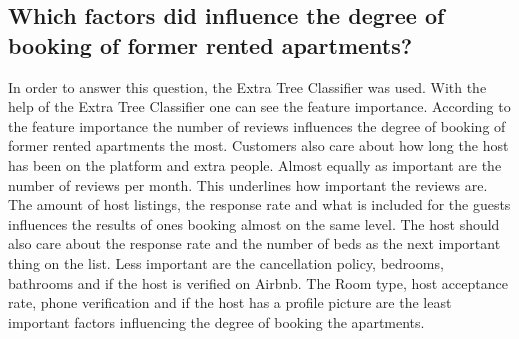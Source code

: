 \subsection{Which factors did influence the degree of booking of former rented apartments? }
In order to answer this question, the Extra Tree Classifier was used. With the help of the Extra Tree Classifier one can see the feature importance. According to the feature importance the number of reviews influences the degree of booking of former rented apartments the most. Customers also care about how long the host has been on the platform and extra people. Almost equally as important are the number of reviews per month. This underlines how important the reviews are. The amount of host listings, the response rate and what is included for the guests influences the results of ones booking almost on the same level. The host should also care about the response rate and the number of beds as the next important thing on the list. Less important are the cancellation policy, bedrooms, bathrooms and if the host is verified on Airbnb. The Room type, host acceptance rate, phone verification and if the host has a profile picture are the least important factors influencing the degree of booking the apartments.
